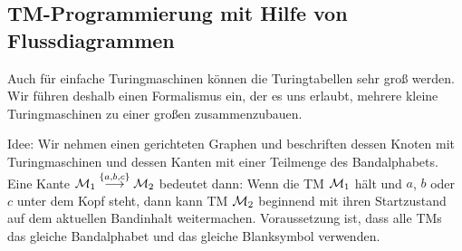 % 
% 

\subsection{\ac{TM}-Programmierung mit Hilfe von Flussdiagrammen}
% 
Auch für einfache Turingmaschinen können die Turingtabellen sehr groß werden.
Wir führen deshalb einen Formalismus ein, der es uns erlaubt, mehrere kleine Turingmaschinen zu einer großen zusammenzubauen.

Idee: Wir nehmen einen gerichteten Graphen und beschriften dessen Knoten mit Turingmaschinen und dessen Kanten mit einer Teilmenge des Bandalphabets.
Eine Kante $\mathcal{M}_1\stackrel{\{a,b,c\}}{\longrightarrow}\mathcal{M}_2$ bedeutet dann:
Wenn die \ac{TM} $\mathcal{M}_1$ hält und $a$, $b$ oder $c$ unter dem Kopf steht, dann kann \ac{TM} $\mathcal{M}_2$ beginnend mit ihren Startzustand auf dem aktuellen Bandinhalt weitermachen.
Voraussetzung ist, dass alle \ac{TM}s das gleiche Bandalphabet und das gleiche Blanksymbol verwenden.

